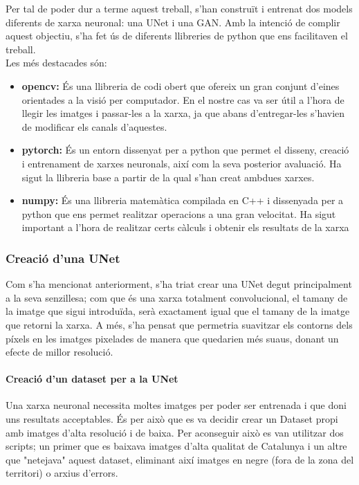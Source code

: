 ﻿\documentclass[10pt,a4paper,twocolumn,twoside]{article}
\begin{document}
Per tal de poder dur a terme aquest treball, s'han construït i entrenat dos models diferents de xarxa neuronal: una UNet i una GAN. Amb la intenció de complir aquest objectiu, s'ha fet ús de diferents llibreries de python que ens facilitaven el treball.\\Les més destacades són:
\begin{itemize}
\item\textbf{opencv: }És una llibreria de codi obert que ofereix un gran conjunt d'eines orientades a la visió per computador. En el nostre cas va ser útil a l'hora de llegir les imatges i passar-les a la xarxa, ja que abans d'entregar-les s'havien de modificar els canals d'aquestes.
\item\textbf{pytorch: }És un entorn dissenyat per a python que permet el disseny, creació i entrenament de xarxes neuronals, així com la seva posterior avaluació. Ha sigut la llibreria base a partir de la qual s'han creat ambdues xarxes.
\item\textbf{numpy: }És una llibreria matemàtica compilada en C++ i dissenyada per a python que ens permet realitzar operacions a una gran velocitat. Ha sigut important a l'hora de realitzar certs càlculs i obtenir els resultats de la xarxa

\end{itemize}

\subsubsection{Creació d'una UNet}
Com s'ha mencionat anteriorment, s'ha triat crear una UNet degut principalment a la seva senzillesa; com que és una xarxa totalment convolucional, el tamany de la imatge que sigui introduïda, serà exactament igual que el tamany de la imatge que retorni la xarxa. A més, s'ha pensat que permetria suavitzar els contorns dels píxels en les imatges pixelades de manera que quedarien més suaus, donant un efecte de millor resolució.
\paragraph{Creació d'un dataset per a la UNet}
Una xarxa neuronal necessita moltes imatges per poder ser entrenada i que doni uns resultats acceptables. És per això que es va decidir crear un Dataset propi amb imatges d'alta resolució i de baixa. Per aconseguir això es van utilitzar dos scripts; un primer que es baixava imatges d'alta qualitat de Catalunya i un altre que "netejava" aquest dataset, eliminant així imatges en negre (fora de la zona del territori) o arxius d'errors.\\
\end{document}
